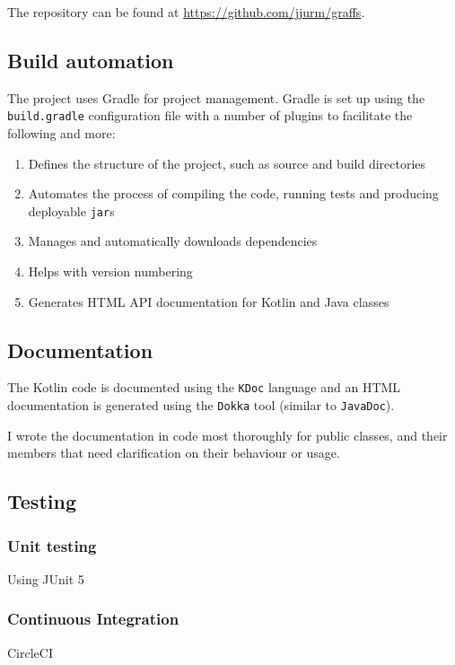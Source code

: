 The repository can be found at \url{https://github.com/jjurm/graffs}.

\subsection{Build automation}

The project uses Gradle for project management.
Gradle is set up using the \texttt{build.gradle} configuration file with a number of plugins to facilitate the following and more:
\begin{enumerate}
    \item Defines the structure of the project, such as source and build directories
    \item Automates the process of compiling the code, running tests and producing deployable \texttt{jar}s
    \item Manages and automatically downloads dependencies
    \item Helps with version numbering
    \item Generates HTML API documentation for Kotlin and Java classes
\end{enumerate}

\subsection{Documentation}

The Kotlin code is documented using the \texttt{KDoc} language and an HTML documentation is generated using the \texttt{Dokka} tool (similar to \texttt{JavaDoc}).

I wrote the documentation in code most thoroughly for public classes, and their members that need clarification on their behaviour or usage.

\subsection{Testing}

\subsubsection{Unit testing}
Using JUnit 5

\subsubsection{Continuous Integration}
CircleCI



